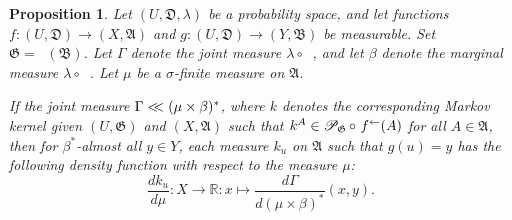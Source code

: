 \documentclass[
twoside=true,
paper=letter,
fontsize=9pt,
pagesize=auto,
leqno,
openany,
headsepline,
overfullrule,
]{scrbook}
\theoremstyle{plain}
\theoremstyle{plain}
\newtheorem{prop}[thm]{Proposition}
\theoremstyle{definition}
\theoremstyle{bfnoteitalic}
\theoremstyle{bfnoteroman}
\newcommand{\sigalg}[1]{\mathfrak{#1}}
\newcommand{\cali}[1]{\mathscr{#1}}
\newcommand{\condprobop}[1]{\mathop{\cali{P}\hspace{-1pt}}\nolimits_{#1}}
\newcommand{\textsigma}{\hbox{\large{$\sigma$}}\kern-1pt}
\newcommand{\preimage}[1]{\mathop{#1^{\leftarrow}}}
\newcommand{\R}{\mathbb{R}}
\newcommand{\sigmaalgebra}{\sigalg{A}}
\newcommand{\sigmaalgebraii}{\sigalg{B}}
\newcommand{\funcg}{g}
\newcommand{\funck}{k}
\newcommand{\function}{f}
\newcommand{\measurespace}{X}
\newcommand{\measurespaceii}{Y}
\newcommand{\mspaceelt}{x}
\newcommand{\mspaceeltii}{y}
\newcommand{\abscont}{\mathrel{< \kern-3.5pt <}}
\newcommand{\measure}{\mu}
\newcommand{\measmu}{\mu}
\newcommand{\measureiii}{\lambda}
\newcommand{\measlambda}{\lambda}
\newcommand{\seti}{A}
\newcommand{\uspace}{U}%
\newcommand{\uspaceelt}{u}
\newcommand{\uspacesig}{\sigalg{D}}
\newcommand{\measonprod}{\Gamma}%
\newcommand{\marginaltwo}{\beta}%
\begin{document}
\begin{prop}\label{conditional_density}
Let
$(\uspace, \uspacesig, \measureiii)$
be a probability space, and let functions
$\function:(\uspace,\uspacesig)\to (\measurespace,\sigmaalgebra)$
and
$\funcg:(\uspace,\uspacesig)\to (\measurespaceii,\sigmaalgebraii)$
be measurable. Set
$\sigalg{G} = \preimage{\funcg}(\sigmaalgebraii)$.
Let $\measonprod$ denote the joint measure $\measureiii\circ\preimage{(\function,\funcg)}$,
and let $\marginaltwo$ denote the marginal measure $\measlambda\circ\preimage{\funcg}$.
Let $\measmu$ be a \textsigma\hyp{}finite  measure on
$\sigmaalgebra$.

If the joint measure
$\measonprod\abscont (\measmu\times\marginaltwo)^*$, where
$\funck$
denotes the corresponding Markov kernel given
$(\uspace,\sigalg{G})$ and $(\measurespace,\sigmaalgebra)$ such that
$\funck^\seti\in
\condprobop{\sigalg{G}}\circ\, \preimage{\function}(\seti)$
for all $\seti\in\sigmaalgebra$,
then
for $\marginaltwo^*$\hyp{}almost all $\mspaceeltii\in\measurespaceii$, each measure
$\funck_\uspaceelt$
on $\sigmaalgebra$ such that $\funcg(\uspaceelt) = \mspaceeltii$
has the following density function with respect to the measure
$\measure$:
\[
\frac{d \funck_\uspaceelt}{d \measure}
:\measurespace\to\R
:\mspaceelt\mapsto
\frac{d\measonprod}{d(\measure\times\marginaltwo)^*}
( \mspaceelt,\mspaceeltii ).
\]
\end{prop}
\end{document}
